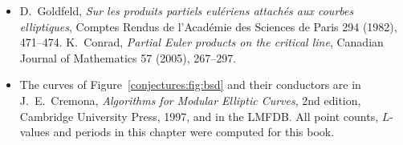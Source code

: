 \begin{itemize}
J.~Voight and M.~M.~Wood, \emph{A heuristic for boundedness of ranks of elliptic curves}, Journal of the European Mathematical Society 21 (2019),
2859--2903.
\item D.~Goldfeld, \emph{Sur les produits partiels eul\'eriens attach\'es aux courbes elliptiques}, Comptes Rendus de l'Acad\'emie des Sciences de Paris
294 (1982), 471--474. K.~Conrad, \emph{Partial Euler products on the critical line}, Canadian Journal of Mathematics 57 (2005), 267--297.
\item The curves of Figure~\ref{conjectures:fig:bsd} and their conductors are in J.~E.~Cremona, \emph{Algorithms for Modular Elliptic Curves}, 2nd edition, Cambridge
University Press, 1997, and in the LMFDB. All point counts, $L$-values and periods in this chapter were computed for this book.
\end{itemize}
